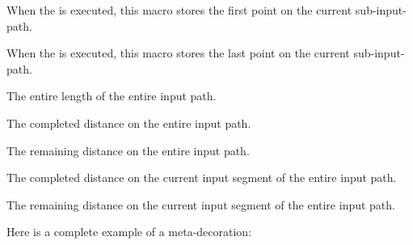 \begin{command}{\pgfdeclaremetadecorate{}}
\begin{command}{\state{}}
    \begin{command}{\pgfpointmetadecoratedpathfirst}
      When the  is executed,
      this macro stores the first point on the current
      sub-input-path.
    \end{command}

    \begin{command}{\pgfpointmetadecoratedpathlast}
      When the  is executed,
      this macro stores the last point on the current
      sub-input-path.
    \end{command}

    \begin{command}{\pgfmetadecoratedpathlength}
      The entire length of the entire input path.
    \end{command}

    \begin{command}{\pgfmetadecoratedcompleteddistance}
      The completed distance on the entire input path.
    \end{command}

    \begin{command}{\pgfmetadecoratedremainingdistance}
      The remaining distance on the entire input path.
    \end{command}

    \begin{command}{\pgfmetadecoratedinputsegmentcompleteddistance}
      The completed distance on the current input segment of the entire
      input path.
    \end{command}

    \begin{command}{\pgfmetadecoratedinputsegmentremainingdistance}
      The remaining distance on the current input segment of the entire
      input path.
    \end{command}
  \end{command}

  Here is a complete example of a meta-decoration:


\end{command}
